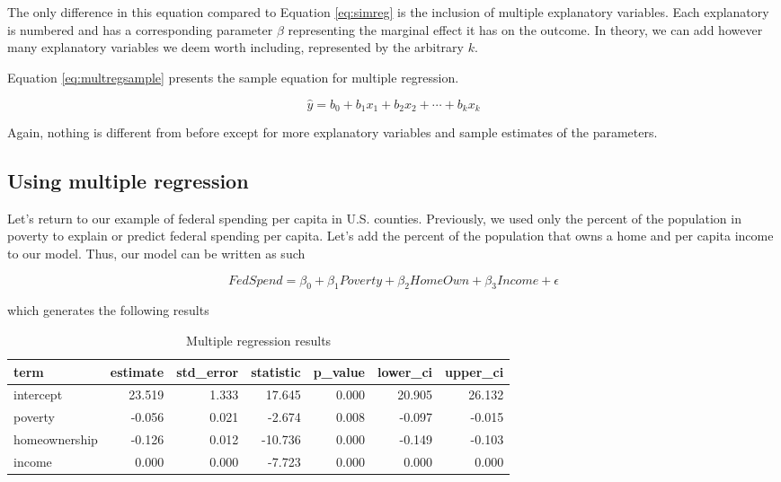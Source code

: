 \documentclass[
]{book}
\begin{document}
The only difference in this equation compared to Equation \eqref{eq:simreg} is the inclusion of multiple explanatory variables. Each explanatory is numbered and has a corresponding parameter \(\beta\) representing the marginal effect it has on the outcome. In theory, we can add however many explanatory variables we deem worth including, represented by the arbitrary \(k\).

Equation \eqref{eq:multregsample} presents the sample equation for multiple regression.

\begin{equation}
\hat{y}=b_0+b_1x_1+b_2x_2+\cdots +b_kx_k
\label{eq:multregsample}
\end{equation}

Again, nothing is different from before except for more explanatory variables and sample estimates of the parameters.

\hypertarget{using-multiple-regression}{%
\subsection{Using multiple regression}\label{using-multiple-regression}}

Let's return to our example of federal spending per capita in U.S. counties. Previously, we used only the percent of the population in poverty to explain or predict federal spending per capita. Let's add the percent of the population that owns a home and per capita income to our model. Thus, our model can be written as such

\begin{equation}
FedSpend = \beta_0 + \beta_1Poverty + \beta_2HomeOwn + \beta_3Income + \epsilon
\label{eq:multregex}
\end{equation}

which generates the following results

\begin{table}

\caption{\label{tab:multregextab}Multiple regression results}
\centering
\begin{tabular}[t]{l|r|r|r|r|r|r}
\hline
term & estimate & std\_error & statistic & p\_value & lower\_ci & upper\_ci\\
\hline
intercept & 23.519 & 1.333 & 17.645 & 0.000 & 20.905 & 26.132\\
\hline
poverty & -0.056 & 0.021 & -2.674 & 0.008 & -0.097 & -0.015\\
\hline
homeownership & -0.126 & 0.012 & -10.736 & 0.000 & -0.149 & -0.103\\
\hline
income & 0.000 & 0.000 & -7.723 & 0.000 & 0.000 & 0.000\\
\hline
\end{tabular}
\end{table}
\end{document}
